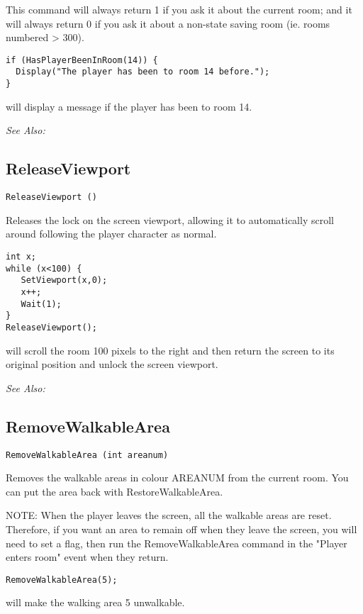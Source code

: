 This command will always return 1 if you ask it about the current room; and it will always
return 0 if you ask it about a non-state saving room (ie. rooms numbered > 300).

\begin{verbatim}
if (HasPlayerBeenInRoom(14)) {
  Display("The player has been to room 14 before.");
}
\end{verbatim}
will display a message if the player has been to room 14.

\it{See Also:} 


\subsection{ReleaseViewport}\label{ReleaseViewport}%

\begin{verbatim}
ReleaseViewport ()
\end{verbatim}
Releases the lock on the screen viewport, allowing it to automatically
scroll around following the player character as normal.

\begin{verbatim}
int x;
while (x<100) {
   SetViewport(x,0);
   x++;
   Wait(1);
}
ReleaseViewport();
\end{verbatim}
will scroll the room 100 pixels to the right and then return the screen to its original position and unlock the screen viewport.

\it{See Also:} 


\subsection{RemoveWalkableArea}\label{RemoveWalkableArea}%

\begin{verbatim}
RemoveWalkableArea (int areanum)
\end{verbatim}
Removes the walkable areas in colour AREANUM from the current room. You can
put the area back with RestoreWalkableArea.

NOTE: When the player leaves the screen, all the walkable areas are reset.
Therefore, if you want an area to remain off when they leave the screen,
you will need to set a flag, then run the RemoveWalkableArea command in
the "Player enters room" event when they return.

\begin{verbatim}
RemoveWalkableArea(5);
\end{verbatim}
will make the walking area 5 unwalkable.

